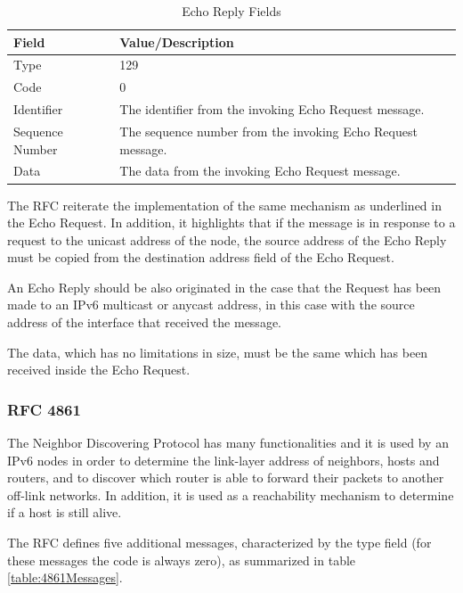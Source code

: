 \documentclass[12pt]{article}
\begin{document}
\begin{savenotes}
\begin{table}[!htpb]
\centering
\addtolength{\tabcolsep}{3pt}
\begin{tabular}{|L{2.0cm}|L{11.0cm}|}
\hline
Field&Value/Description\\
\hline
Type&129\\
\hline
Code&0\\
\hline
Identifier&The identifier from the invoking Echo Request message.\\
\hline
Sequence Number&The sequence number from the invoking Echo Request message.\\
\hline
Data&The data from the invoking Echo Request message.\\
\hline
\end{tabular}
\caption{Echo Reply Fields}
\label{table:echoRepFields}
\end{table}
\end{savenotes}
The RFC reiterate the implementation of the same mechanism as underlined in the Echo Request. In addition, it highlights that if the message is in response to a request to the unicast address of the node, the source address of the Echo Reply must be copied from the destination address field of the Echo Request.

An Echo Reply should be also originated in the case that the Request has been made to an IPv6 multicast or anycast address, in this case with the source address of the interface that received the message.

The data, which has no limitations in size, must be the same which has been received inside the Echo Request.


\subsubsection{RFC 4861}
\label{subsub:4861}

The Neighbor Discovering Protocol has many functionalities and it is used by an IPv6 nodes in order to determine the link-layer address of neighbors, hosts and routers, and to discover which router is able to forward their packets to another off-link networks. In addition, it is used as a reachability mechanism to determine if a host is still alive.

The RFC defines five additional messages, characterized by the type field (for these messages the code is always zero), as summarized in table \ref{table:4861Messages}.
\end{document}
